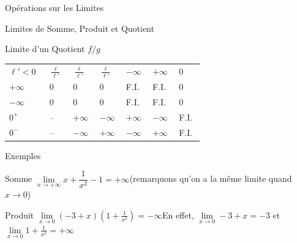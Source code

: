 \documentclass{coursbook}
\begin{document}
\begin{Gpartie}{Opérations sur les Limites}
\begin{Spartie}{Limites de Somme, Produit et Quotient}
\begin{SSpartie}{Limite d'un Quotient $f/g$}
\begin{table}[H]
\begin{tabular}{ p{0.15\linewidth} *{6}{M{0.08\linewidth}} }
                        $\ell'<0$ & $\frac{\ell}{\ell'}$ & $\frac{\ell}{\ell'}$ & $\frac{\ell}{\ell'}$ & $-\infty$ & $+\infty$ & $0$ \\
                        $+\infty$ & $0$ & $0$ & $0$ & F.I. & F.I. & $0$ \\
                        $-\infty$ & $0$ & $0$ & $0$ & F.I. & F.I. & $0$ \\
                        $0^+$ & -- & $+\infty$ & $-\infty$ & $+\infty$ & $-\infty$ & F.I. \\
                        $0^-$ & -- & $-\infty$ & $+\infty$ & $-\infty$ & $+\infty$ & F.I. \\ \bottomrule
                    \end{tabular}
                \end{table}
            \end{SSpartie}
            \begin{SSpartie}{Exemples} 
                \begin{SSSpartie}{Somme} 
                    $\lim\limits_{x\to+\infty}x+\dfrac{1}{x^2}-1=+\infty$\quad(remarquons qu'on a la même limite quand $x\to0$)
                \end{SSSpartie}
                \begin{SSSpartie}{Produit} 
                    $\lim\limits_{x\to0}\left(-3+x\right)\left(1+\frac{1}{x^2}\right)=-\infty$\qquad En effet, $\lim\limits_{x\to0}-3+x=-3$ et $\lim\limits_{x\to0}1+\frac{1}{x^2}=+\infty$
    

\end{SSSpartie}
\end{SSpartie}
\end{Spartie}
\end{Gpartie}
\end{document}
